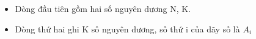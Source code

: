 \begin{itemize}
	\item Dòng đầu tiên gồm hai số nguyên dương N, K.
	\item Dòng thứ hai ghi K số nguyên dương, số thứ i của dãy số là $A_{i}$
\end{itemize}